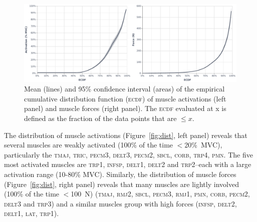 \begin{figure}[H]
    \centering\includegraphics[width=1\linewidth]{fig/ecdf_general.pdf}
    \caption{Mean (lines) and 95\% confidence interval (areas) of the empirical cumulative distribution function (\textsc{ecdf}) of muscle activations (left panel) and muscle forces (right panel).
    The \textsc{ecdf} evaluated at x is defined as the fraction of the data points that are $\leq x$.}
    \label{fig:general_ecdf}
\end{figure}

The distribution of muscle activations (Figure~\ref{fig:dist}, left panel) reveals that several muscles are weakly activated (100\% of the time $<$20\%~MVC), particularly the \textsc{tmaj}, \textsc{tric}, \textsc{pecm}3, \textsc{delt}3, \textsc{pecm}2, \textsc{sbcl}, \textsc{corb}, \textsc{trp}4, \textsc{pmn}.
The five most activated muscles are \textsc{trp}1, \textsc{infsp}, \textsc{delt}1, \textsc{delt}2 and \textsc{trp}2--each with a large activation range (10-80\% MVC).
Similarly, the distribution of muscle forces (Figure~\ref{fig:dist}, right panel) reveals that many muscles are lightly involved (100\% of the time $<$100~N) (\textsc{tmaj}, \textsc{rmj}2, \textsc{sbcl}, \textsc{pecm}3, \textsc{rmj}1, \textsc{pmn}, \textsc{corb}, \textsc{pecm}2, \textsc{delt}3 and \textsc{trp}3) and a similar muscles group with high forces (\textsc{infsp}, \textsc{delt}2, \textsc{delt}1, \textsc{lat}, \textsc{trp}1).

